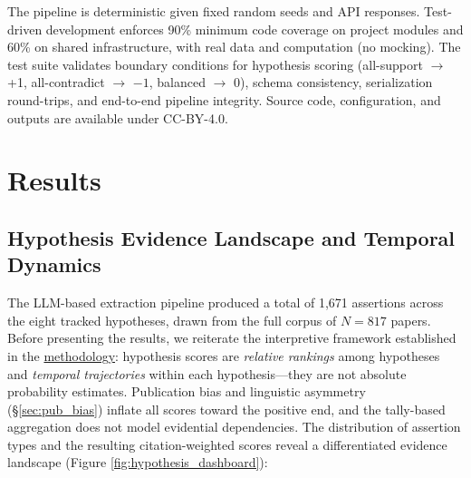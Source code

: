 \documentclass[
  english,
]{article}
\begin{document}
The pipeline is deterministic given fixed random seeds and API
responses. Test-driven development enforces 90\% minimum code coverage
on project modules and 60\% on shared infrastructure, with real data and
computation (no mocking). The test suite validates boundary conditions
for hypothesis scoring (all-support \(\to\) +1, all-contradict \(\to\)
\(-1\), balanced \(\to\) 0), schema consistency, serialization
round-trips, and end-to-end pipeline integrity. Source code,
configuration, and outputs are available under CC-BY-4.0.

\newpage

\section{\texorpdfstring{Results
\label{sec:results}}{Results}}\label{results}

\subsection{\texorpdfstring{Hypothesis Evidence Landscape and Temporal
Dynamics
\label{sec:hypothesis_results}}{Hypothesis Evidence Landscape and Temporal Dynamics}}\label{hypothesis-evidence-landscape-and-temporal-dynamics}

The LLM-based extraction pipeline produced a total of 1,671 assertions
across the eight tracked hypotheses, drawn from the full corpus of
\(N = 817\) papers. Before presenting the results, we reiterate the
interpretive framework established in the
\hyperref[sec:methods_kg]{methodology}: hypothesis scores are
\emph{relative rankings} among hypotheses and \emph{temporal
trajectories} within each hypothesis---they are not absolute probability
estimates. Publication bias and linguistic asymmetry
(\S\ref{sec:pub_bias}) inflate all scores toward the positive end, and
the tally-based aggregation does not model evidential dependencies. The
distribution of assertion types and the resulting citation-weighted
scores reveal a differentiated evidence landscape (Figure
\ref{fig:hypothesis_dashboard}):
\end{document}
